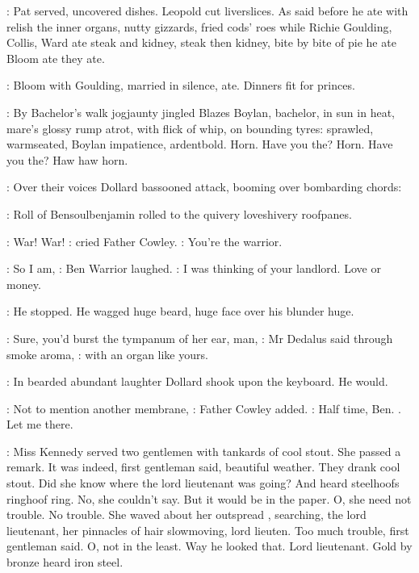 :
Pat served,
uncovered dishes.
Leopold cut liverslices.
As said before he ate with relish the inner organs,
nutty gizzards,
fried cods' roes while
Richie Goulding,
Collis,
Ward ate steak and kidney,
steak then kidney,
bite by bite of pie he ate Bloom ate they ate.

:
Bloom with Goulding,
married in silence,
ate.
Dinners fit for princes.

:
By Bachelor's walk jogjaunty jingled Blazes Boylan,
bachelor,
in sun
in heat,
mare's glossy rump atrot,
with flick of whip,
on bounding tyres:
sprawled,
warmseated,
Boylan impatience,
ardentbold.
Horn.
Have you
the?
Horn.
Have you the?
Haw haw horn.

:
Over their voices Dollard bassooned attack,
booming over bombarding
chords:


:
Roll of Bensoulbenjamin rolled to the
quivery loveshivery roofpanes.

\cowley:
War!
War!
:
cried Father Cowley.
\cowley:
You're the warrior.

\dollard:
So I am,
:
Ben Warrior laughed.
\dollard:
I was thinking of your landlord.
Love or money.

:
He stopped.
He wagged huge beard,
huge face over his blunder huge.

\simon:
Sure,
you'd burst the tympanum of her ear,
man,
:
Mr Dedalus said through smoke aroma,
\simon:
with an organ like yours.

:
In bearded abundant laughter Dollard shook upon the keyboard.
He would.

\cowley:
Not to mention another membrane,
:
Father Cowley added.
\cowley:
Half time,
Ben.
.
Let me there.

:
Miss Kennedy served two gentlemen with tankards of cool stout.
She
passed a remark.
It was indeed,
first gentleman said,
beautiful weather.
They drank cool stout.
Did she know where the lord lieutenant was going?
And heard steelhoofs ringhoof ring.
No,
she couldn't say.
But it would be
in the paper.
O,
she need not trouble.
No trouble.
She waved about her
outspread ,
searching,
the lord lieutenant,
her pinnacles of
hair slowmoving,
lord lieuten.
Too much trouble,
first gentleman said.
O,
not in the least.
Way he looked that.
Lord lieutenant.
Gold by bronze
heard iron steel.%


